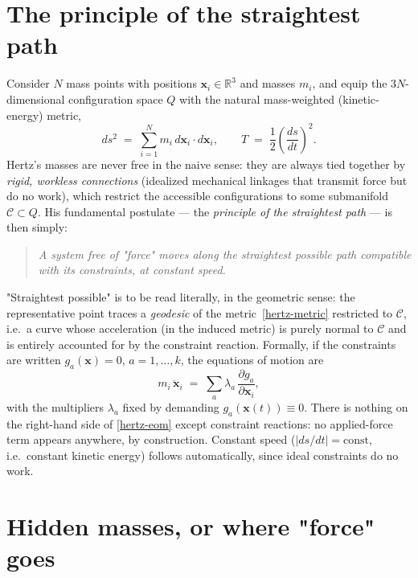 \section{The principle of the straightest path}

Consider $N$ mass points with positions $\mathbf x_i\in\mathbb R^3$
and masses $m_i$, and equip the $3N$-dimensional configuration space
$Q$ with the natural mass-weighted (kinetic-energy) metric,
\begin{equation}
  ds^2 \;=\; \sum_{i=1}^N m_i\, d\mathbf x_i\cdot d\mathbf x_i,
  \qquad
  T \;=\; \frac12\left(\frac{ds}{dt}\right)^{\!2}.
  \label{hertz-metric}
\end{equation}
Hertz's masses are never free in the naive sense: they are always
tied together by \emph{rigid, workless connections} (idealized
mechanical linkages that transmit force but do no work), which
restrict the accessible configurations to some submanifold
$\mathcal C\subset Q$. His fundamental postulate --- the
\emph{principle of the straightest path}
--- is then simply:

\begin{quote}
\emph{A system free of "force" moves along the straightest possible
path compatible with its constraints, at constant speed.}
\end{quote}

"Straightest possible" is to be read literally, in the geometric
sense: the representative point traces a \emph{geodesic} of the
metric~\eqref{hertz-metric} restricted to $\mathcal C$, i.e.\ a
curve whose acceleration (in the induced metric) is purely normal to
$\mathcal C$ and is entirely accounted for by the constraint
reaction. Formally, if the constraints are written $g_a(\mathbf
x)=0$, $a=1,\dots,k$, the equations of motion are
\begin{equation}
  m_i\,\ddot{\mathbf x}_i \;=\; \sum_a \lambda_a\,
  \frac{\partial g_a}{\partial \mathbf x_i},
  \label{hertz-eom}
\end{equation}
with the multipliers $\lambda_a$ fixed by demanding $g_a(\mathbf
x(t))\equiv 0$. There is nothing on the right-hand side of
\eqref{hertz-eom} except constraint reactions: no applied-force
term appears anywhere, by construction. Constant speed
($|ds/dt|=\mathrm{const}$, i.e.\ constant kinetic energy) follows
automatically, since ideal constraints do no work.

\section{Hidden masses, or where "force" goes}

